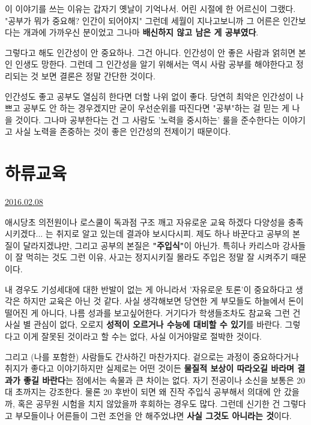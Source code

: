 이 이야기를 쓰는 이유는 갑자기 옛날이 기억나서.
어린 시절에 한 어르신이 그랬다. "공부가 뭐가 중요해? 인간이 되어야지"
그런데 세월이 지나고보니까 그 어른은 인간보다는 개과에 가까우신 분이었고
그나마 \textbf{배신하지 않고 남은 게 공부였다}.
\vspace{5mm}

그렇다고 해도 인간성이 안 중요하나. 그건 아니다. 인간성이 안 좋은 사람과 얽히면 본인 인생도 망한다.
그런데 그 인간성을 알기 위해서는 역시 사람 공부를 해야한다고 정리되는 것 보면 결론은 정말 간단한 것이다.
\vspace{5mm}

인간성도 좋고 공부도 열심히 한다면 더할 나위 없이 좋다.
당연히 최악은 인간성이 나쁘고 공부도 안 하는 경우겠지만
굳이 우선순위를 따진다면 "공부"하는 걸 믿는 게 나을 것이다.
그나마 공부한다는 건 그 사람도 '노력을 중시하는' 룰을 준수한다는 이야기고
사실 노력을 존중하는 것이 좋은 인간성의 전제이기 때문이다.
\vspace{5mm}






\section{하류교육}
\href{https://www.kockoc.com/Apoc/627628}{2016.02.08}

\vspace{5mm}

애시당초 의전원이나 로스쿨이 독과점 구조 깨고 자유로운 교육 하겠다 다양성을 충족시키겠다... 는 취지로 알고 있는데
결과야 보시다시피. 제도 하나 바꾼다고 공부의 본질이 달라지겠냐만, 그리고 공부의 본질은 \textbf{"주입식"}이 아닌가.
특히나 카리스마 강사들이 잘 먹히는 것도 그런 이유,  사고는 정지시키질 몰라도 주입은 정말 잘 시켜주기 때문이다.
\vspace{5mm}

내 경우도 기성세대에 대한 반발이 없는 게 아니라서 '자유로운 토론'이 중요하다고 생각은 하지만 교육은 아닌 것 같다.
사실 생각해보면 당연한 게 부모들도 하늘에서 돈이 떨어진 게 아니다, 나름 성과를 보고싶어한다.
거기다가 학생들조차도 참교육 그런 건 사실 별 관심이 없다, 오로지 \textbf{성적이 오르거나 수능에 대비할 수 있기}를 바란다.
그렇다고 이게 잘못된 것이라고 할 수는 없다, 사실 이거야말로 절박한 것이다.
\vspace{5mm}

그리고 (나를 포함한) 사람들도 간사하긴 마찬가지다.
겉으로는 과정이 중요하다거나 취지가 좋다고 이야기하지만
실제로는 어떤 것이든 \textbf{물질적 보상이 따라오길 바라며 결과가 좋길 바란다}는 점에서는 속물과 큰 차이는 없다.
자기 전공이나 소신을 보통은 20대 초까지는 강조한다.
물론 20 후반이 되면 왜 진작 주입식 공부해서 의대에 안 갔을까, 혹은 공무원 시험을 치지 않았을까 후회하는 경우도 많다.
그런데 신기한 건 그렇다고 부모들이나 어른들이 그런 조언을 안 해주었냐면 \textbf{사실 그것도 아니라는 것}이다.
\vspace{5mm}

